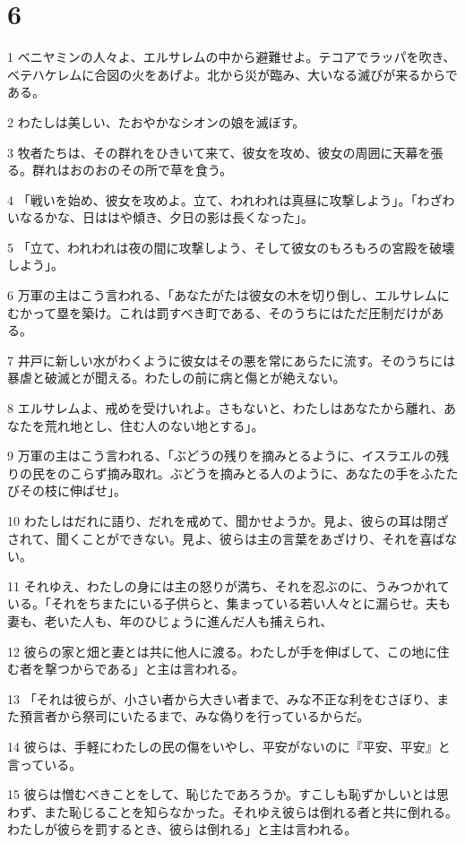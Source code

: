 \chapter{6}

\par 1 ベニヤミンの人々よ、エルサレムの中から避難せよ。テコアでラッパを吹き、ベテハケレムに合図の火をあげよ。北から災が臨み、大いなる滅びが来るからである。
\par 2 わたしは美しい、たおやかなシオンの娘を滅ぼす。
\par 3 牧者たちは、その群れをひきいて来て、彼女を攻め、彼女の周囲に天幕を張る。群れはおのおのその所で草を食う。
\par 4 「戦いを始め、彼女を攻めよ。立て、われわれは真昼に攻撃しよう」。「わざわいなるかな、日ははや傾き、夕日の影は長くなった」。
\par 5 「立て、われわれは夜の間に攻撃しよう、そして彼女のもろもろの宮殿を破壊しよう」。
\par 6 万軍の主はこう言われる、「あなたがたは彼女の木を切り倒し、エルサレムにむかって塁を築け。これは罰すべき町である、そのうちにはただ圧制だけがある。
\par 7 井戸に新しい水がわくように彼女はその悪を常にあらたに流す。そのうちには暴虐と破滅とが聞える。わたしの前に病と傷とが絶えない。
\par 8 エルサレムよ、戒めを受けいれよ。さもないと、わたしはあなたから離れ、あなたを荒れ地とし、住む人のない地とする」。
\par 9 万軍の主はこう言われる、「ぶどうの残りを摘みとるように、イスラエルの残りの民をのこらず摘み取れ。ぶどうを摘みとる人のように、あなたの手をふたたびその枝に伸ばせ」。
\par 10 わたしはだれに語り、だれを戒めて、聞かせようか。見よ、彼らの耳は閉ざされて、聞くことができない。見よ、彼らは主の言葉をあざけり、それを喜ばない。
\par 11 それゆえ、わたしの身には主の怒りが満ち、それを忍ぶのに、うみつかれている。「それをちまたにいる子供らと、集まっている若い人々とに漏らせ。夫も妻も、老いた人も、年のひじょうに進んだ人も捕えられ、
\par 12 彼らの家と畑と妻とは共に他人に渡る。わたしが手を伸ばして、この地に住む者を撃つからである」と主は言われる。
\par 13 「それは彼らが、小さい者から大きい者まで、みな不正な利をむさぼり、また預言者から祭司にいたるまで、みな偽りを行っているからだ。
\par 14 彼らは、手軽にわたしの民の傷をいやし、平安がないのに『平安、平安』と言っている。
\par 15 彼らは憎むべきことをして、恥じたであろうか。すこしも恥ずかしいとは思わず、また恥じることを知らなかった。それゆえ彼らは倒れる者と共に倒れる。わたしが彼らを罰するとき、彼らは倒れる」と主は言われる。
